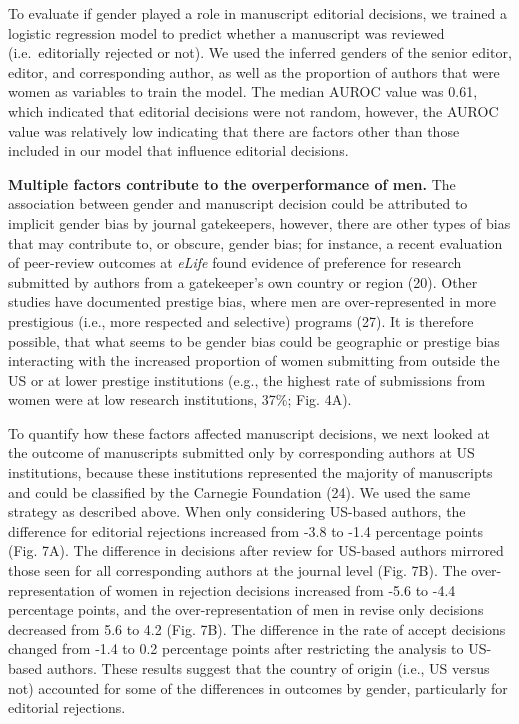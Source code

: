 \documentclass[11pt,]{article}
\begin{document}
To evaluate if gender played a role in manuscript editorial decisions,
we trained a logistic regression model to predict whether a manuscript
was reviewed (i.e.~editorially rejected or not). We used the inferred
genders of the senior editor, editor, and corresponding author, as well
as the proportion of authors that were women as variables to train the
model. The median AUROC value was 0.61, which indicated that editorial
decisions were not random, however, the AUROC value was relatively low
indicating that there are factors other than those included in our model
that influence editorial decisions.

\textbf{Multiple factors contribute to the overperformance of men.} The
association between gender and manuscript decision could be attributed
to implicit gender bias by journal gatekeepers, however, there are other
types of bias that may contribute to, or obscure, gender bias; for
instance, a recent evaluation of peer-review outcomes at \emph{eLife}
found evidence of preference for research submitted by authors from a
gatekeeper's own country or region (20). Other studies have documented
prestige bias, where men are over-represented in more prestigious (i.e.,
more respected and selective) programs (27). It is therefore possible,
that what seems to be gender bias could be geographic or prestige bias
interacting with the increased proportion of women submitting from
outside the US or at lower prestige institutions (e.g., the highest rate
of submissions from women were at low research institutions, 37\%; Fig.
4A).

To quantify how these factors affected manuscript decisions, we next
looked at the outcome of manuscripts submitted only by corresponding
authors at US institutions, because these institutions represented the
majority of manuscripts and could be classified by the Carnegie
Foundation (24). We used the same strategy as described above. When only
considering US-based authors, the difference for editorial rejections
increased from -3.8 to -1.4 percentage points (Fig. 7A). The difference
in decisions after review for US-based authors mirrored those seen for
all corresponding authors at the journal level (Fig. 7B). The
over-representation of women in rejection decisions increased from -5.6
to -4.4 percentage points, and the over-representation of men in revise
only decisions decreased from 5.6 to 4.2 (Fig. 7B). The difference in
the rate of accept decisions changed from -1.4 to 0.2 percentage points
after restricting the analysis to US-based authors. These results
suggest that the country of origin (i.e., US versus not) accounted for
some of the differences in outcomes by gender, particularly for
editorial rejections.
\end{document}
